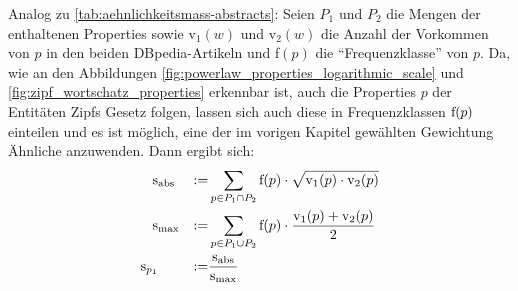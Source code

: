 Analog zu \ref{tab:aehnlichkeitsmass-abstracts}:
Seien $P_1$ und $P_2$ die Mengen der enthaltenen Properties sowie v$_1(w)$ und v$_2(w)$ die Anzahl der Vorkommen von $p$ in den beiden DBpedia-Artikeln und f$(p)$ die "`Frequenzklasse"'\footnotemark{} von $p$.
Da, wie an den Abbildungen \ref{fig:powerlaw_properties_logarithmic_scale} und \ref{fig:zipf_wortschatz_properties} erkennbar ist, auch die Properties $p$ der Entitäten Zipfs Gesetz folgen,
lassen sich auch diese in Frequenzklassen $\textnormal{f}(p)$ einteilen und es ist möglich, eine der im vorigen Kapitel gewählten Gewichtung Ähnliche anzuwenden.
Dann ergibt sich:
\begin{subequations}
\begin{align}
\textnormal{s}&_{\textnormal{abs}} 	&:=& \sum_{p\in P_1\cap P_2} \textnormal{f}(p)\cdot\sqrt{\textnormal{v}_1(p)\cdot	\textnormal{v}_2(p)}\\
\textnormal{s}&_{\max}		&:=& \sum_{p\in P_1\cup P_2} \textnormal{f}(p)\cdot\frac{\textnormal{v}_1(p)+	\textnormal{v}_2(p)}{2}\\
\textnormal{s}_{p_1}	&		&:=& \frac{\textnormal{s}_{\textnormal{abs}}}{\textnormal{s}_{\max}}
\end{align}
\label{tab:aehnlichkeitsmass-semantisch}
\end{subequations}

